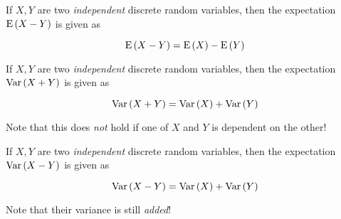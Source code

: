 \begin{definition}
    If $X, Y$ are two \textit{independent} discrete random variables, then the expectation $\mathrm{E} \left( X - Y \right)$ is given as
    
    \begin{equation}
        \mathrm{E} \left( X - Y \right) = \mathrm{E} \left( X \right) - \mathrm{E} \left( Y \right)
    \end{equation}
\end{definition}

\begin{definition}
    If $X, Y$ are two \textit{independent} discrete random variables, then the expectation $\mathrm{Var} \left( X + Y \right)$ is given as
    
    \begin{equation}
        \mathrm{Var} \left( X + Y \right) = \mathrm{Var} \left( X \right) + \mathrm{Var} \left( Y \right)
    \end{equation}
    
    Note that this does \textit{not} hold if one of $X$ and $Y$ is dependent on the other!
\end{definition}

\begin{definition}
    If $X, Y$ are two \textit{independent} discrete random variables, then the expectation $\mathrm{Var} \left( X - Y \right)$ is given as
    
    \begin{equation}
        \mathrm{Var} \left( X - Y \right) = \mathrm{Var} \left( X \right) + \mathrm{Var} \left( Y \right)
    \end{equation}
    
    Note that their variance is still \textit{added}!
\end{definition}

